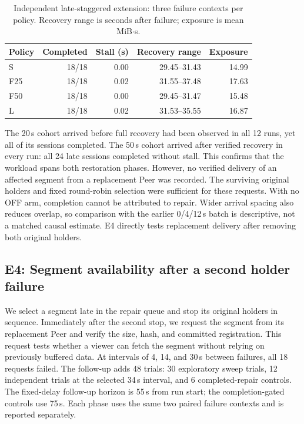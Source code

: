 \begin{table}[ht]
\centering\small
\caption{Independent late-staggered extension: three failure contexts per
policy. Recovery range is seconds after failure; exposure is mean MiB$\cdot$s.}
\label{tab:e3-late}
\begin{tabular}{@{}lrrrr@{}}
\toprule
Policy & Completed & Stall (s) & Recovery range & Exposure \\
\midrule
S   & 18/18 & 0.00 & 29.45--31.43 & 14.99 \\
F25 & 18/18 & 0.02 & 31.55--37.48 & 17.63 \\
F50 & 18/18 & 0.00 & 29.45--31.47 & 15.48 \\
L   & 18/18 & 0.02 & 31.53--35.55 & 16.87 \\
\bottomrule
\end{tabular}
\end{table}

The 20\,s cohort arrived before full recovery had been observed in all
12 runs, yet all of its sessions completed. The 50\,s cohort arrived after
verified recovery in every run: all 24 late sessions completed without
stall. This confirms that the workload spans both restoration phases.
However, no verified delivery of an affected segment from a replacement
Peer was recorded. The surviving original holders and fixed round-robin
selection were sufficient for these requests. With no OFF arm, completion
cannot be attributed to repair. Wider arrival spacing also reduces
overlap, so comparison with the earlier 0/4/12\,s batch is descriptive,
not a matched causal estimate. E4 directly tests replacement delivery
after removing both original holders.

\subsection{E4: Segment availability after a second holder failure}
We select a segment late in the repair queue and stop its original
holders in sequence. Immediately after the second stop, we request the
segment from its replacement Peer and verify the size, hash, and committed
registration. This request tests whether a viewer can fetch the segment
without relying on previously buffered data. At intervals of 4, 14,
and 30\,s between failures, all 18 requests failed.
The follow-up adds 48 trials: 30 exploratory sweep trials, 12 independent
trials at the selected 34\,s interval, and 6 completed-repair controls.
The fixed-delay follow-up horizon is 55\,s from run start; the
completion-gated controls use 75\,s. Each phase uses the same two paired
failure contexts and is reported separately.

